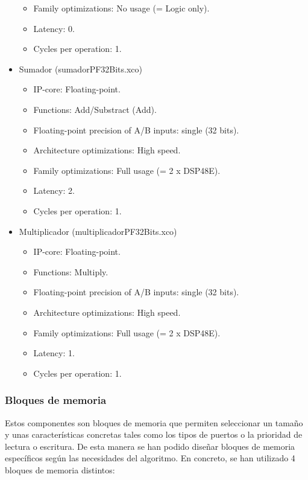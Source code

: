 \begin{itemize}
\begin{itemize}
            \item Family optimizations: No usage (= Logic only).
            \item Latency: 0.
            \item Cycles per operation: 1.
        \end{itemize}
    \item Sumador (sumadorPF32Bits.xco)
        \begin{itemize}
            \item IP-core: Floating-point.
            \item Functions: Add/Substract (Add).
            \item Floating-point precision of A/B inputs: single (32 bits).
            \item Architecture optimizations: High speed.
            \item Family optimizations: Full usage (= 2 x DSP48E).
            \item Latency: 2.
            \item Cycles per operation: 1.
        \end{itemize}
    \item Multiplicador (multiplicadorPF32Bits.xco)
        \begin{itemize}
            \item IP-core: Floating-point.
            \item Functions: Multiply.
            \item Floating-point precision of A/B inputs: single (32 bits).
            \item Architecture optimizations: High speed.
            \item Family optimizations: Full usage (= 2 x DSP48E).
            \item Latency: 1.
            \item Cycles per operation: 1.
        \end{itemize}
\end{itemize}

\subsubsection{Bloques de memoria}

Estos componentes son bloques de memoria que permiten seleccionar un tamaño y unas características concretas tales como los tipos de puertos o la prioridad de lectura o escritura. De esta manera se han podido diseñar bloques de memoria específicos según las necesidades del algoritmo. En concreto, se han utilizado 4 bloques de memoria distintos:


